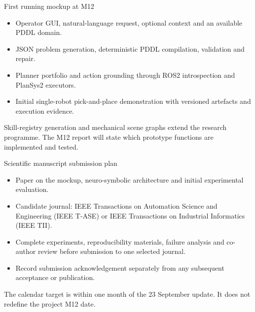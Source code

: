 \documentclass[aspectratio=169,10pt]{beamer}
\begin{document}
\begin{frame}{First running mockup at M12}
\begin{itemize}\items
\item Operator GUI, natural-language request, optional context and an available PDDL domain.
\item JSON problem generation, deterministic PDDL compilation, validation and repair.
\item Planner portfolio and action grounding through ROS2 introspection and PlanSys2 executors.
\item Initial single-robot pick-and-place demonstration with versioned artefacts and execution evidence.
\end{itemize}
\small Skill-registry generation and mechanical scene graphs extend the research programme. The M12 report will state which prototype functions are implemented and tested.
\end{frame}

\begin{frame}{Scientific manuscript submission plan}
\begin{itemize}\items
\item Paper on the mockup, neuro-symbolic architecture and initial experimental evaluation.
\item Candidate journal: IEEE Transactions on Automation Science and Engineering (IEEE T-ASE) or IEEE Transactions on Industrial Informatics (IEEE TII).
\item Complete experiments, reproducibility materials, failure analysis and co-author review before submission to one selected journal.
\item Record submission acknowledgement separately from any subsequent acceptance or publication.
\end{itemize}
\small The calendar target is within one month of the 23 September update. It does not redefine the project M12 date.
\end{frame}
\end{document}
